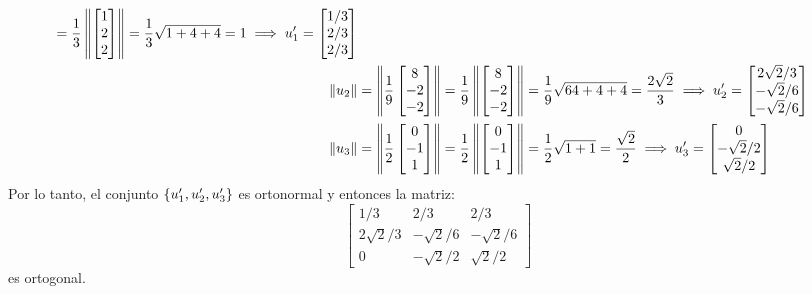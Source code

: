 \begin{solution}
\begin{align*}
{		} =\dfrac{1}{3}\left\Vert 
		\begin{bmatrix}
			1 \\ 2 \\ 2
		\end{bmatrix}
		 \right\Vert =\dfrac{1}{3}\sqrt{1 + 4 + 4} = 1 \implies u_{1}' =
		\begin{bmatrix}
			1/3 \\ 2/3 \\ 2/3
		\end{bmatrix}\\
		\left\Vert u_{2} \right\Vert &=\left\Vert \dfrac{1}{9}
		\begin{bmatrix}
			8 \\ -2 \\ -2
		\end{bmatrix}	
		 \right\Vert =\dfrac{1}{9}\left\Vert 
		\begin{bmatrix}
			8 \\ -2 \\ -2
		\end{bmatrix}
		 \right\Vert =\dfrac{1}{9}\sqrt{64 + 4 + 4} =\dfrac{2\sqrt{2}}{3} \implies u_{2}' =
		\begin{bmatrix}
			2\sqrt{2}/3 \\ -\sqrt{2}/6 \\ -\sqrt{2}/6
		\end{bmatrix}\\
		\left\Vert u_{3} \right\Vert &=\left\Vert \dfrac{1}{2}
		\begin{bmatrix}
			0 \\ -1 \\ 1
		\end{bmatrix}
		 \right\Vert =\dfrac{1}{2}\left\Vert 
		\begin{bmatrix}
			0 \\ -1 \\ 1
		\end{bmatrix}
		 \right\Vert =\dfrac{1}{2}\sqrt{1 + 1} =\dfrac{\sqrt{2}}{2}\implies u_{3}' =
		\begin{bmatrix}
			0 \\ -\sqrt{2}/2 \\ \sqrt{2}/2
		\end{bmatrix}
	\end{align*}
	Por lo tanto, el conjunto $\left\{ u_{1}', u_{2}', u_{3}' \right\}$ es ortonormal y entonces la matriz:
	\[ \begin{bmatrix}
		1/3 & 2/3 & 2/3\\
		2\sqrt{2}/3 & -\sqrt{2}/6 & -\sqrt{2}/6\\
		0 & -\sqrt{2}/2 & \sqrt{2}/2
	\end{bmatrix} \]
	es ortogonal.
\end{solution}